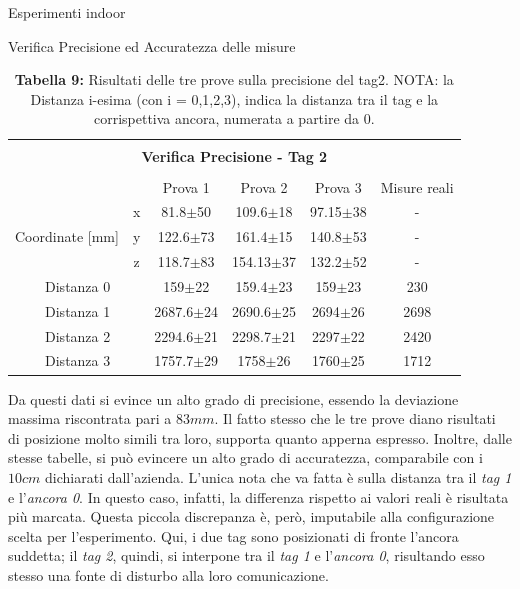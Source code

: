 \documentclass[12pt]{report}
\begin{document}
\begin{section}{Esperimenti indoor}
\begin{subsection}{Verifica Precisione ed Accuratezza delle misure}
			\begin{table}[H]
				\centering
				\begin{tabular}{|l|c|c|c|c|c|}
					\hline
					\multicolumn{6}{|c|}{}\\
					\multicolumn{6}{|c|}{\textbf{\Large Verifica Precisione - Tag 2}}\\
					\multicolumn{6}{|c|}{}\\
					\hline
					\multicolumn{2}{|c|}{}&												Prova 1&							Prova 2&						Prova 3&					Misure reali\\
					\hline
					\multirow{3}{*}{Coordinate [mm]}&			x&					81.8$\pm$50&					109.6$\pm$18&			97.15$\pm$38&		-\\
					\cline{2-6}
					&																y&					122.6$\pm$73&				161.4$\pm$15&			140.8$\pm$53&		-\\
					\cline{2-6}
					&																z&					118.7$\pm$83&				154.13$\pm$37&			132.2$\pm$52&		-\\
					\hline
					\multicolumn{2}{|c|}{Distanza 0}&								159$\pm$22&					159.4$\pm$23&			159$\pm$23&			230\\
					\hline
					\multicolumn{2}{|c|}{Distanza 1}&								2687.6$\pm$24&				2690.6$\pm$25&			2694$\pm$26&			2698\\
					\hline
					\multicolumn{2}{|c|}{Distanza 2}&								2294.6$\pm$21&				2298.7$\pm$21&			2297$\pm$22&			2420\\
					\hline
					\multicolumn{2}{|c|}{Distanza 3}&								1757.7$\pm$29&				1758$\pm$26&			1760$\pm$25&				1712\\
					\hline
				\end{tabular}
				\caption{\textbf{Tabella 9: } Risultati delle tre prove sulla precisione del tag2. NOTA: la Distanza i-esima (con i = 0,1,2,3), indica la distanza tra il tag e la corrispettiva ancora, numerata a partire da 0.\label{EspPrecis2}}
			\end{table}

			Da questi dati si evince un alto grado di precisione, essendo la deviazione massima riscontrata pari a $83mm$. Il fatto stesso che le tre prove diano risultati di posizione molto simili tra loro, supporta quanto apperna espresso. Inoltre, dalle stesse tabelle, si può evincere un alto grado di accuratezza, 									comparabile con i $10cm$ dichiarati dall’azienda. L’unica nota che va fatta è sulla distanza tra il \textit{tag 1} e l’\textit{ancora 0}. In questo caso, infatti, la differenza rispetto ai valori reali è risultata più marcata. Questa piccola discrepanza è, però, imputabile alla configurazione scelta per l'esperimento. Qui, i 					due tag sono posizionati di fronte l’ancora suddetta; il \textit{tag 2}, quindi, si interpone tra il \textit{tag 1} e l’\textit{ancora 0}, risultando esso stesso una fonte di disturbo alla loro comunicazione. 


\end{subsection}
\end{section}
\end{document}
